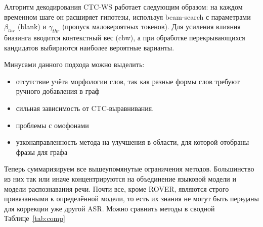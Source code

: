 Алгоритм декодирования CTC-WS работает следующим образом: на каждом временном шаге он расширяет гипотезы, используя beam-search с параметрами $\beta_{thr}$ (blank) и $\gamma_{thr}$ (пропуск маловероятных токенов).
Для усиления влияния биазинга вводится контекстный вес (cbw), а при обработке перекрывающихся кандидатов выбираются наиболее вероятные варианты.

Минусами данного подхода можно выделить:
\begin{itemize}
  \item отсутствие учёта морфологии слов, так как разные формы слов требуют ручного добавления в граф
  \item сильная зависимость от CTC-выравнивания.
  \item проблемы с омофонами
  \item узконаправленность метода на улучшения в области, для которой отобраны фразы для графа
\end{itemize}

Теперь суммаризируем все вышеупомянутые ограничения методов.
Большинство из них так или иначе концентрируются на объединение языковой модели и модели распознавания речи.
Почти все, кроме ROVER, являются строго привязанными к определённой модели, то есть их знания не могут быть переданы для коррекции уже другой ASR.
Можно сравнить методы в сводной Таблице~\ref{tab:comp}


